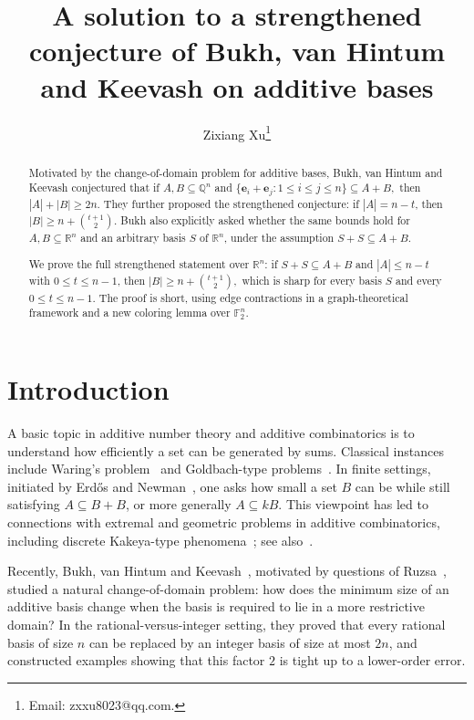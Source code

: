 \documentclass[11pt]{article}
\title{A solution to a strengthened conjecture of Bukh, van Hintum and Keevash on additive bases}
\author{
Zixiang Xu\thanks{Email: zxxu8023@qq.com.}
}
\date{}
\theoremstyle{definition}
\begin{document}
\maketitle
\begin{abstract}
Motivated by the change-of-domain problem for additive bases, Bukh, van Hintum and Keevash conjectured that if \(A,B\subseteq \mathbb{Q}^{n}\) and
\(
    \{\boldsymbol{e}_i+\boldsymbol{e}_j:1\le i\le j\le n\}\subseteq A+B,
\)
then \(|A|+|B|\ge 2n\). They further proposed the strengthened conjecture: if
\(
    |A|=n-t\), then \(|B|\ge n+\binom{t+1}{2}.
\)
Bukh also explicitly asked whether the same bounds hold for \(A,B\subseteq \mathbb{R}^{n}\) and an arbitrary basis \(S\) of \(\mathbb{R}^{n}\), under the assumption \(S+S\subseteq A+B\).

We prove the full strengthened statement over \(\mathbb{R}^{n}\): if \(S+S\subseteq A+B\) and \(|A|\le n-t\) with \(0\le t\le n-1\), then
\(
    |B|\ge n+\binom{t+1}{2},
\)
which is sharp for every basis \(S\) and every \(0\le t\le n-1.\)
 The proof is short, using edge contractions in a graph-theoretical framework and a new coloring lemma over \(\mathbb F_2^n\).

\end{abstract}


\section{Introduction}
A basic topic in additive number theory and additive combinatorics is to understand how efficiently a set can be generated by sums. Classical instances include Waring's problem~\cite{1964Sinica,1909Hilbert} and Goldbach-type problems~\cite{1973Sinica,2015Helfgott,1937Vinogradov}.  In finite settings, initiated by Erd\H{o}s and Newman~\cite{1977ErdosNewman}, one asks how small a set \(B\) can be while still satisfying \(A\subseteq B+B\), or more generally \(A\subseteq kB\).  This viewpoint has led to connections with extremal and geometric problems in additive combinatorics, including discrete Kakeya-type phenomena~\cite{2009IsrABS}; see also~\cite{1996Nathanson,2006Book}.

Recently, Bukh, van Hintum and Keevash~\cite{2025ATCAarith}, motivated by questions of Ruzsa~\cite{2024Ruzsa}, studied a natural change-of-domain problem: how does the minimum size of an additive basis change when the basis is required to lie in a more restrictive domain?  In the rational-versus-integer setting, they proved that every rational basis of size \(n\) can be replaced by an integer basis of size at most \(2n\), and constructed examples showing that this factor \(2\) is tight up to a lower-order error.
\end{document}

